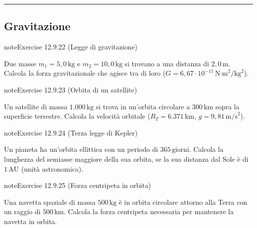 \documentclass[letterpaper,10pt,italian]{jupyterBook}
\begin{document}
\bigskip\hrule\bigskip



\subsection{Gravitazione}
\label{\detokenize{ch/mechanics/dynamics-problems:gravitazione}} \label{exercise:ch/mechanics/dynamics-problems-exercise-21}

\begin{sphinxadmonition}{note}{Exercise 12.9.22 (Legge di gravitazione)}



\sphinxAtStartPar
Due masse \(m_1 = 5,0 \, \text{kg}\) e \(m_2 = 10,0 \, \text{kg}\) si trovano a una distanza di \(2,0 \, \text{m}\). Calcola la forza gravitazionale che agisce tra di loro (\(G = 6,67 \cdot 10^{-11} \, \text{N·m}^2/\text{kg}^2\)).
\end{sphinxadmonition}
 \label{exercise:ch/mechanics/dynamics-problems-exercise-22}

\begin{sphinxadmonition}{note}{Exercise 12.9.23 (Orbita di un satellite)}



\sphinxAtStartPar
Un satellite di massa \(1.000 \, \text{kg}\) si trova in un’orbita circolare a \(300 \, \text{km}\) sopra la superficie terrestre. Calcola la velocità orbitale (\(R_T = 6.371 \, \text{km}\), \(g = 9,81 \, \text{m/s}^2\)).
\end{sphinxadmonition}
 \label{exercise:ch/mechanics/dynamics-problems-exercise-23}

\begin{sphinxadmonition}{note}{Exercise 12.9.24 (Terza legge di Kepler)}



\sphinxAtStartPar
Un pianeta ha un’orbita ellittica con un periodo di \(365 \, \text{giorni}\). Calcola la lunghezza del semi\sphinxhyphen{}asse maggiore della sua orbita, se la sua distanza dal Sole è di \(1 \, \text{AU}\) (unità astronomica).
\end{sphinxadmonition}
 \label{exercise:ch/mechanics/dynamics-problems-exercise-24}

\begin{sphinxadmonition}{note}{Exercise 12.9.25 (Forza centripeta in orbita)}



\sphinxAtStartPar
Una navetta spaziale di massa \(500 \, \text{kg}\) è in orbita circolare attorno alla Terra con un raggio di \(500 \, \text{km}\). Calcola la forza centripeta necessaria per mantenere la navetta in orbita.
\end{sphinxadmonition}
 \label{exercise:ch/mechanics/dynamics-problems-exercise-25}
\end{document}
